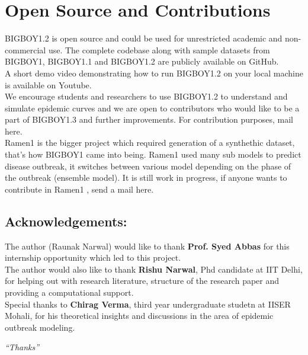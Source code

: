 \documentclass[11pt,a4paper]{article}
\theoremstyle{remark}\newtheorem{remark}{Remark}
\begin{document}
\section{Open Source and Contributions}
BIGBOY1.2 is open source and could be used for unrestricted academic and non-commercial use. The complete codebase along with sample datasets from BIGBOY1, BIGBOY1.1 and BIGBOY1.2 are publicly available on GitHub. \\
A short demo video demonstrating how to run BIGBOY1.2 on your local machine is available on Youtube. \\
We encourage students and researchers to use BIGBOY1.2 to understand and simulate epidemic curves and we are open to contributors who would like to be a part of BIGBOY1.3 and further improvements. For contribution purposes, mail here. \\
Ramen1 is the bigger project which required generation of a synthethic dataset, that's how BIGBOY1 came into being. Ramen1 used many sub models to predict disease outbreak, it switches between various model depending on the phase of the outbreak (ensemble model). It is still work in progress,  if anyone wants to contribute in Ramen1 , send a mail here. \\
\subsection{Acknowledgements: } The author (Raunak Narwal) would like to thank \textbf{Prof. Syed Abbas} for this internship opportunity which led to this project.\\
The author would also like to thank \textbf{Rishu Narwal}, Phd candidate at IIT Delhi, for  helping out with research literature, structure of the research paper and providing a computational support.\\
Special thanks to \textbf{Chirag Verma}, third year undergraduate studetn at IISER Mohali, for his theoretical insights and discussions in the area of epidemic outbreak modeling.

 
  

\vspace{4mm}
\begin{center}
\textit{\large ``Thanks''} \\
\end{center}
\end{document}
